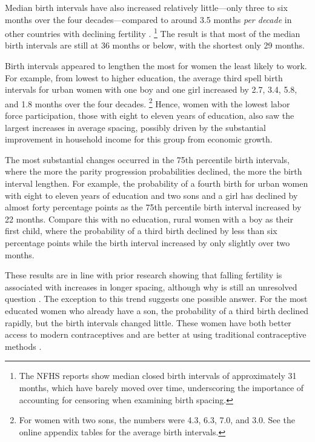 \documentclass[12pt,letterpaper]{article}
\begin{document}
Median birth intervals have also increased relatively little---only three to six months 
over the four decades---compared to around 3.5 months \emph{per decade} in other countries with 
declining fertility \citep{Rutstein2011,Casterline2016}.%
\footnote{
The NFHS reports show median closed birth intervals of approximately 31 months, which have 
barely moved over time, underscoring the importance of accounting for censoring when examining 
birth spacing.
}
The result is that most of the median birth intervals are still at 36 months or below, 
with the shortest only 29 months.


Birth intervals appeared to lengthen the most for women the least likely to work.
For example, from lowest to higher education, the average third spell birth intervals for 
urban women with one boy and one girl increased by 2.7, 3.4, 5.8, and 1.8 months over the 
four decades.%
\footnote{
For women with two sons, the numbers were 4.3, 6.3, 7.0, and 3.0.
See the online appendix tables for the average birth intervals.
}
Hence, women with the lowest labor force participation, those with eight to eleven years 
of education, also saw the largest increases in average spacing, possibly driven by the 
substantial improvement in household income for this group from economic growth.


The most substantial changes occurred in the 75th percentile birth intervals, where the 
more the parity progression probabilities declined, the more the birth interval lengthen. 
For example, the probability of a fourth birth for urban women with eight to eleven years 
of education and two sons and a girl has declined by almost forty percentage points as the 
75th percentile birth interval increased by 22 months.
Compare this with no education, rural women with a boy as their first child, where the 
probability of a third birth declined by less than six percentage points while the birth 
interval increased by only slightly over two months.


These results are in line with prior research showing that falling fertility is associated 
with increases in longer spacing, although why is still an unresolved question 
\citep{Casterline2016}.
The exception to this trend suggests one possible answer.
For the most educated women who already have a son, the probability of a third birth 
declined rapidly, but the birth intervals changed little.
These women have both better access to modern contraceptives and are better at using 
traditional contraceptive methods \citep{Rosenzweig1989}.
\end{document}
